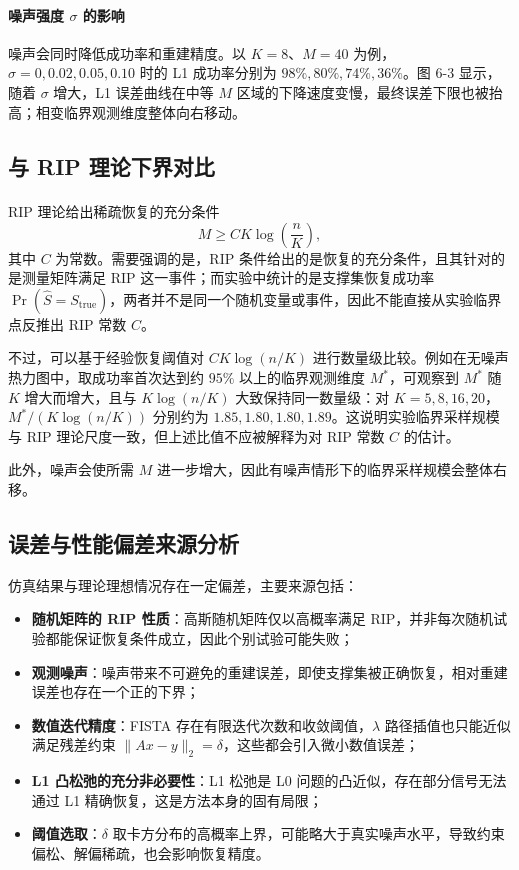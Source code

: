\documentclass[UTF8]{ctexart}
\numberwithin{figure}{section}
\newcommand{\scite}[1]{\textsuperscript{\cite{#1}}}
\theoremstyle{definition}
\theoremstyle{examplestyle}
\theoremstyle{remark}
\begin{document}
\paragraph*{噪声强度 $\sigma$ 的影响}
噪声会同时降低成功率和重建精度。以 $K=8$、$M=40$ 为例，$\sigma=0,0.02,0.05,0.10$ 时的 L1 成功率分别为 $98\%,80\%,74\%,36\%$。图 6-3 显示，随着 $\sigma$ 增大，L1 误差曲线在中等 $M$ 区域的下降速度变慢，最终误差下限也被抬高；相变临界观测维度整体向右移动。

\subsection{与 RIP 理论下界对比}
\label{sec:rip-comparison}

RIP 理论给出稀疏恢复的充分条件~\scite{candes2005decoding}
\begin{equation}
\label{eq:rip-bound}
M\ge C K\log\left(\frac{n}{K}\right),
\end{equation}
其中 $C$ 为常数。需要强调的是，RIP 条件给出的是恢复的充分条件，且其针对的是测量矩阵满足 RIP 这一事件；而实验中统计的是支撑集恢复成功率 $\Pr(\hat{S}=S_{\mathrm{true}})$，两者并不是同一个随机变量或事件，因此不能直接从实验临界点反推出 RIP 常数 $C$。

不过，可以基于经验恢复阈值对 $C K\log(n/K)$ 进行数量级比较。例如在无噪声热力图中，取成功率首次达到约 $95\%$ 以上的临界观测维度 $M^*$，可观察到 $M^*$ 随 $K$ 增大而增大，且与 $K\log(n/K)$ 大致保持同一数量级：对 $K=5,8,16,20$，$M^*/\left(K\log(n/K)\right)$ 分别约为 $1.85,1.80,1.80,1.89$。这说明实验临界采样规模与 RIP 理论尺度一致，但上述比值不应被解释为对 RIP 常数 $C$ 的估计。

此外，噪声会使所需 $M$ 进一步增大，因此有噪声情形下的临界采样规模会整体右移。

\subsection{误差与性能偏差来源分析}
\label{sec:error-sources}

仿真结果与理论理想情况存在一定偏差，主要来源包括：

\begin{itemize}
\item \textbf{随机矩阵的 RIP 性质}：高斯随机矩阵仅以高概率满足 RIP，并非每次随机试验都能保证恢复条件成立，因此个别试验可能失败；
\item \textbf{观测噪声}：噪声带来不可避免的重建误差，即使支撑集被正确恢复，相对重建误差也存在一个正的下界；
\item \textbf{数值迭代精度}：FISTA 存在有限迭代次数和收敛阈值，$\lambda$ 路径插值也只能近似满足残差约束 $\|Ax-y\|_2=\delta$，这些都会引入微小数值误差；
\item \textbf{L1 凸松弛的充分非必要性}：L1 松弛是 L0 问题的凸近似，存在部分信号无法通过 L1 精确恢复，这是方法本身的固有局限；
\item \textbf{阈值选取}：$\delta$ 取卡方分布的高概率上界，可能略大于真实噪声水平，导致约束偏松、解偏稀疏，也会影响恢复精度。
\end{itemize}
\end{document}
